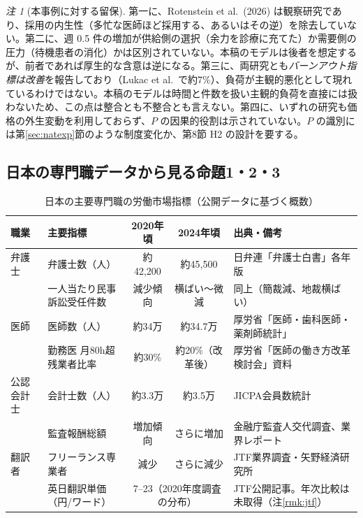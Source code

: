 \documentclass[11pt]{article}
\theoremstyle{plain}
\theoremstyle{definition}
\theoremstyle{remark}
\newtheorem*{rmk}{注}
\begin{document}
\begin{rmk}[本事例に対する留保]
第一に、Rotenstein et al.\ (2026) は観察研究であり、採用の内生性（多忙な医師ほど採用する、あるいはその逆）を除去していない。第二に、週 0.5 件の増加が供給側の選択（余力を診療に充てた）か需要側の圧力（待機患者の消化）かは区別されていない。本稿のモデルは後者を想定するが、前者であれば厚生的な含意は逆になる。第三に、両研究とも\emph{バーンアウト指標は改善}を報告しており（Lukac et al.\ で約7\%）、負荷が主観的悪化として現れているわけではない。本稿のモデルは時間と件数を扱い主観的負荷を直接には扱わないため、この点は整合とも不整合とも言えない。第四に、いずれの研究も価格の外生変動を利用しておらず、$P$ の因果的役割は示されていない。$P$ の識別には第\ref{sec:natexp}節のような制度変化か、第8節 H2 の設計を要する。
\end{rmk}

\subsection{日本の専門職データから見る命題1・2・3}

\begin{table}[h]\centering\small
\caption{日本の主要専門職の労働市場指標（公開データに基づく概数）}\label{tab:jp}
\begin{tabularx}{\textwidth}{@{}lXccX@{}}
\toprule
職業 & 主要指標 & 2020年頃 & 2024年頃 & 出典・備考 \\ \midrule
弁護士 & 弁護士数（人） & 約42,200 & 約45,500 & 日弁連「弁護士白書」各年版 \\
 & 一人当たり民事訴訟受任件数 & 減少傾向 & 横ばい〜微減 & 同上（簡裁減、地裁横ばい） \\
医師 & 医師数（人） & 約34万 & 約34.7万 & 厚労省「医師・歯科医師・薬剤師統計」 \\
 & 勤務医 月80h超残業者比率 & 約30\% & 約20\%（改革後） & 厚労省「医師の働き方改革検討会」資料 \\
公認会計士 & 会計士数（人） & 約3.3万 & 約3.5万 & JICPA会員数統計 \\
 & 監査報酬総額 & 増加傾向 & さらに増加 & 金融庁監査人交代調査、業界レポート \\
翻訳者 & フリーランス専業者 & 減少 & さらに減少 & JTF業界調査・矢野経済研究所 \\
 & 英日翻訳単価（円/ワード） & \multicolumn{2}{c}{7--23（2020年度調査の分布）} & JTF公開記事。年次比較は未取得（注\ref{rmk:jtf}） \\
\bottomrule
\end{tabularx}
\end{table}
\end{document}
